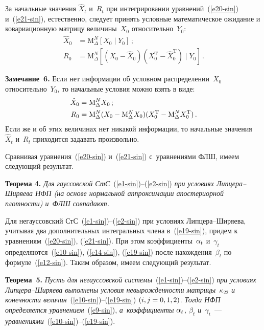 \begin{multicols}{2}
За начальные значения $\hat{X}_t$ и~$R_t$  при интегрировании уравнений~(\ref{e20-sin}) и~(\ref{e21-sin}), естественно, следует принять
условные математическое ожидание и ковариационную матрицу величины~$X_0$ относительно~$Y_0$:
\begin{align*}
\hat{X}_0 &= \mathrm{M}^N_\Delta\left[ X_0 \mid Y_0\right]\,;\\
R_0 &= \mathrm{M}^N_\Delta \left[ \left(X_0 -\hat X_0\right) \left(X_0^{\mathrm{T}} -\hat{X}_0^{\mathrm{T}}\right )\mid Y_0\right]\,.
\end{align*}

\noindent
\textbf{Замечание~6.}
Если нет информации об условном распределении~$X_0$ относительно~$Y_0$, то
начальные условия можно взять в виде:
\begin{align*}
\hat{X}_0 &= \mathrm{M}^N_\Delta X_0\,;\\
R_0&= \mathrm{M}^N_\Delta (X_0 \hm-\mathrm{M}^N_\Delta X_0)
(X_0^{\mathrm{T}} - \mathrm{M}^N_\Delta X_0^{\mathrm{T}})\,.
\end{align*}
Если
же и об этих величинах нет никакой информации, то начальные
значения $\hat X_t$ и~$R_t$ приходится задавать произвольно.

Сравнивая  уравнения~(\ref{e20-sin}) и~(\ref{e21-sin}) с~уравнениями ФЛШ, имеем следующий результат.

\smallskip

\noindent
\textbf{Теорема 4.} \textit{Для гауссовской СтС}~(\ref{e1-sin})--(\ref{e2-sin}) \textit{при условиях Лип\-це\-ра--Ши\-ря\-ева НФП (на основе нормальной аппроксимации апостериорной плотности) и~ФЛШ совпадают.}

\smallskip

Для негауссовский СтС~(\ref{e1-sin})--(\ref{e2-sin}) при условиях Лип\-це\-ра--Ши\-ря\-ева, учитывая два дополнительных интегральных члена в~(\ref{e19-sin}), придем к уравнениям~(\ref{e20-sin}), (\ref{e21-sin}). При этом коэффициенты~$\alpha_t$ и~$\gamma_t$ определяются~(\ref{e10-sin}), (\ref{e14-sin}), (\ref{e19-sin}) после нахождения~$\beta_t$ по формуле~(\ref{e12-sin}). Таким образом, имеем следующий результат.

\smallskip

\noindent
\textbf{Теорема~5.} \textit{Пусть для негауссовской системы}~(\ref{e1-sin})--(\ref{e2-sin})
\textit{при условиях Лип\-це\-ра--Ши\-ря\-ева выполнены условия невырожденности матрицы~$\kappa_{22}$ и конечности величин}~(\ref{e10-sin})--(\ref{e19-sin}) $(i, j \hm=0,1,2)$.
\textit{Тогда НФП определяется уравнением}~(\ref{e9-sin}),
\textit{а~коэффициенты $\alpha_t$, $\beta_t$ и~$\gamma_t$}~---
\textit{уравнениями}~(\ref{e10-sin})--(\ref{e19-sin}).



\end{multicols}

